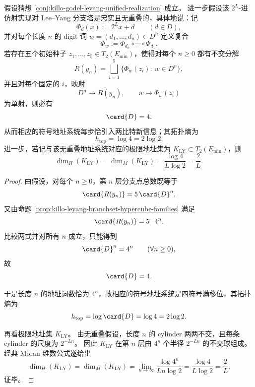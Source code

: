 \begin{theorem}\label{thm:killo-leyang-unified-digit-rigidity}
假设猜想 \ref{conj:killo-godel-leyang-unified-realization} 成立。
进一步假设该 \(2^L\)-进仿射实现对 Lee--Yang 分支塔是忠实且无重叠的，具体地说：记
\[
\Phi_d(x):=2^Lx+d\qquad (d\in D),
\]
并对每个长度 \(n\) 的 digit 词 \(w=(d_1,\dots,d_n)\in D^n\) 定义复合
\[
\Phi_w:=\Phi_{d_n}\circ\cdots\circ\Phi_{d_1}.
\]
若存在五个初始种子 \(z_1,\dots,z_5\in T_2(E_{\min})\)，使得对每个 \(n\ge 0\) 都有不交分解
\[
R(y_n)=\bigsqcup_{i=1}^{5}\{\Phi_w(z_i):\ w\in D^n\},
\]
并且对每个固定的 \(i\)，映射
\[
D^n\to R(y_n),\qquad w\mapsto \Phi_w(z_i)
\]
为单射，则必有
\[
\card{D}=4.
\]
从而相应的符号地址系统每步恰引入两比特新信息；其拓扑熵为
\[
h_{\mathrm{top}}=\log 4=2\log 2.
\]
进一步，若记与该无重叠地址系统对应的极限地址集为 \(K_{\mathrm{LY}}\subset T_2(E_{\min})\)，则
\[
\dim_H(K_{\mathrm{LY}})=\dim_M(K_{\mathrm{LY}})=\frac{\log 4}{L\log 2}=\frac{2}{L}.
\]
\end{theorem}
\begin{proof}
由假设，对每个 \(n\ge 0\)，第 \(n\) 层分支点总数既等于
\[
\card{R(y_n)}=5\,\card{D}^n,
\]
又由命题 \ref{prop:killo-leyang-branchset-hypercube-families} 满足
\[
\card{R(y_n)}=5\cdot 4^n.
\]
比较两式并对所有 \(n\) 成立，只能得到
\[
\card{D}^n=4^n\qquad (\forall n\ge 0),
\]
故
\[
\card{D}=4.
\]

于是长度 \(n\) 的地址词数恰为 \(4^n\)，故相应的符号地址系统是四符号满移位，其拓扑熵为
\[
h_{\mathrm{top}}=\log\card{D}=\log 4=2\log 2.
\]

再看极限地址集 \(K_{\mathrm{LY}}\)。
由无重叠假设，长度 \(n\) 的 cylinder 两两不交，且每条 cylinder 的尺度为 \(2^{-Ln}\)。
因此 \(K_{\mathrm{LY}}\) 在第 \(n\) 层由 \(4^n\) 个半径 \(2^{-Ln}\) 的不交球组成。
经典 Moran 维数公式遂给出
\[
\dim_H(K_{\mathrm{LY}})=\dim_M(K_{\mathrm{LY}})
=
\lim_{n\to\infty}\frac{\log 4^n}{Ln\log 2}
=
\frac{\log 4}{L\log 2}
=
\frac{2}{L}.
\]
证毕。
\end{proof}

\endinput
